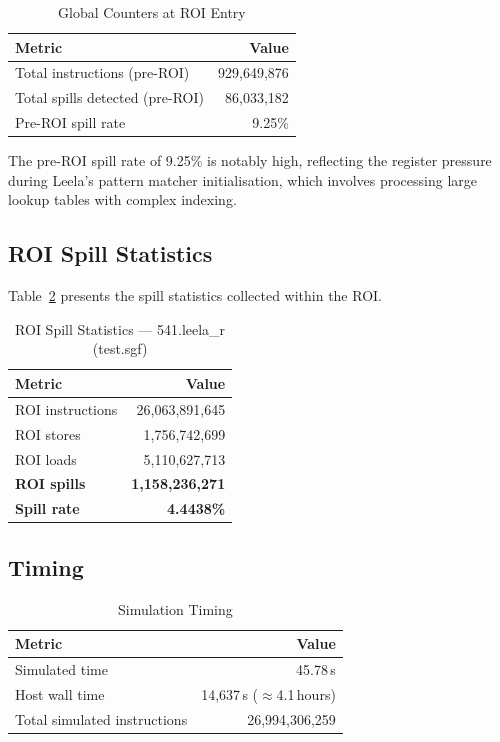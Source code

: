\documentclass[conference]{IEEEtran}
\begin{document}
\begin{table}[H]
\centering
\caption{Global Counters at ROI Entry}
\label{tab:preroi}
\begin{tabular}{lr}
\toprule
\textbf{Metric} & \textbf{Value} \\
\midrule
Total instructions (pre-ROI) & 929,649,876 \\
Total spills detected (pre-ROI) & 86,033,182 \\
Pre-ROI spill rate & 9.25\% \\
\bottomrule
\end{tabular}
\end{table}

The pre-ROI spill rate of 9.25\% is notably high, reflecting the
register pressure during Leela's pattern matcher initialisation, which
involves processing large lookup tables with complex indexing.

\subsection{ROI Spill Statistics}

Table~\ref{tab:roi} presents the spill statistics collected within
the ROI.

\begin{table}[H]
\centering
\caption{ROI Spill Statistics --- 541.leela\_r (test.sgf)}
\label{tab:roi}
\begin{tabular}{lr}
\toprule
\textbf{Metric} & \textbf{Value} \\
\midrule
ROI instructions         & 26,063,891,645 \\
ROI stores               &  1,756,742,699 \\
ROI loads                &  5,110,627,713 \\
\midrule
\textbf{ROI spills}      & \textbf{1,158,236,271} \\
\textbf{Spill rate}      & \textbf{4.4438\%} \\
\bottomrule
\end{tabular}
\end{table}

\subsection{Timing}

\begin{table}[H]
\centering
\caption{Simulation Timing}
\label{tab:timing}
\begin{tabular}{lr}
\toprule
\textbf{Metric} & \textbf{Value} \\
\midrule
Simulated time           & 45.78\,s \\
Host wall time           & 14,637\,s ($\approx$4.1\,hours) \\
Total simulated instructions & 26,994,306,259 \\
\bottomrule
\end{tabular}
\end{table}
\end{document}
